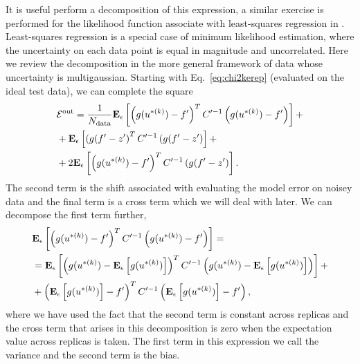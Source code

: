 It is useful perform a decomposition of this expression, a similar exercise is
performed for the likelihood function associate with least-squares regression in
\cite{mlforphysics}. Least-squares regression is a special case of minimum
likelihood estimation, where the uncertainty on each data point is equal in
magnitude and uncorrelated. Here we review the decomposition in the more general
framework of data whose uncertainty is multigaussian. Starting with
Eq.~\ref{eq:chi2kerep} (evaluated on the ideal test data), we can complete the
square
\begin{equation}
    \begin{split}
        &\mathcal{E}^{\rm out} = \frac{1}{N_{\rm data}} \mathbf{E}_{\epsilon}\left[ 
            \left( g(u^{* (k)}) - f^\prime \right)^T
            C^{\prime -1}
            \left( g(u^{* (k)}) - f^\prime \right)
         \right] + \\
        &+ \mathbf{E}_{\epsilon}\left[ 
            \left( g(f^\prime - z^\prime \right)^T
            C^{\prime -1}
            \left( g(f^\prime - z^\prime \right)
         \right]+ \\
        &+ 2 \mathbf{E}_{\epsilon}\left[ 
            \left( g(u^{* (k)}) - f^\prime \right)^T
            C^{\prime -1}
            \left( g(f^\prime - z^\prime \right)
         \right].
    \end{split}
\end{equation}
The second term is the shift associated with evaluating the model error on
noisey data and the final term is a cross term which we will deal with later. We
can decompose the first term further,
\begin{equation}
    \begin{split}
        &\mathbf{E}_{\epsilon}\left[ 
            \left( g(u^{* (k)}) - f^\prime \right)^T
            C^{\prime -1}
            \left( g(u^{* (k)}) - f^\prime \right)
         \right] = \\
        &= \mathbf{E}_{\epsilon}\left[ 
            \left( g(u^{* (k)}) - \mathbf{E}_{\epsilon}\left[ g(u^{* (k)}) \right] \right)^T
            C^{\prime -1}
            \left( g(u^{* (k)}) - \mathbf{E}_{\epsilon}\left[ g(u^{* (k)}) \right] \right)
         \right] + \\
        &+ \left( \mathbf{E}_{\epsilon}\left[ g(u^{* (k)}) \right] - f^\prime \right)^T
        C^{\prime -1}
        \left( \mathbf{E}_{\epsilon}\left[ g(u^{* (k)}) \right] - f^\prime \right),
    \end{split}
\end{equation}
where we have used the fact that the second term is constant across replicas and
the cross term that arises in this decomposition is zero when the expectation
value across replicas is taken. The first term in this expression we call the
variance and the second term is the bias.

